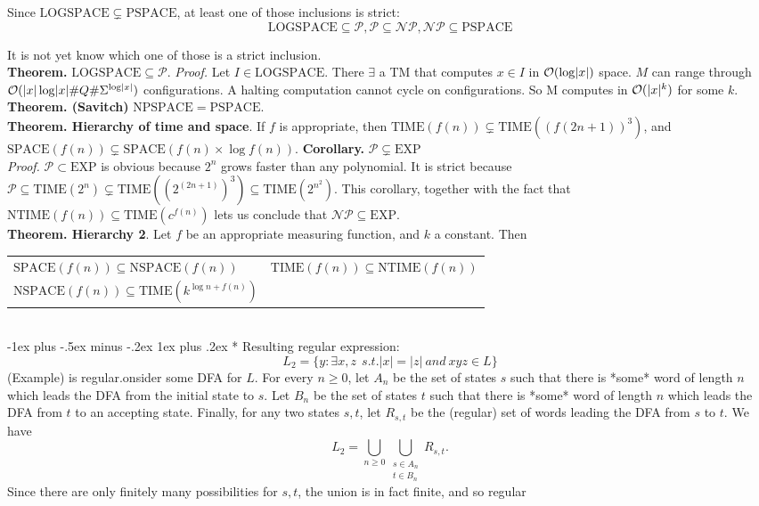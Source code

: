 \documentclass[10pt,landscape]{article}
\makeatletter
\renewcommand{\P}{\mathcal{P}}
\newcommand{\NP}{\mathcal{NP}}
\newcommand{\LOGSPACE}{\mathrm{LOGSPACE}}
\newcommand{\SPACE}{\mathrm{SPACE}}
\newcommand{\PSPACE}{\mathrm{PSPACE}}
\newcommand{\NSPACE}{\mathrm{NSPACE}}
\newcommand{\NPSPACE}{\mathrm{NPSPACE}}
\newcommand{\EXP}{\mathrm{EXP}}
\newcommand{\TIME}{\mathrm{TIME}}
\newcommand{\NTIME}{\mathrm{NTIME}}
\renewcommand{\O}{\mathcal{O}}
\DeclarePairedDelimiter\abs{\lvert}{\rvert}
\theoremstyle{plain}%
\theoremstyle{definition}
\theoremstyle{remark}
\renewcommand{\subsubsection}{\@startsection{subsubsection}{3}{0mm}%
                                {-1ex plus -.5ex minus -.2ex}%
                                {1ex plus .2ex}%
                                {\normalfont\small\bfseries}}
\makeatother
\begin{document}
\begin{multicols}{3}
Since $\LOGSPACE \subsetneq \PSPACE$, at least one of those inclusions is strict:
\[ \LOGSPACE \subseteq \P, \P \subseteq \NP, \NP \subseteq \PSPACE \]

It is not yet know which one of those is a strict inclusion. \\[.2cm]

\textbf{Theorem. } $\LOGSPACE \subseteq \P$. \textit{Proof.}
Let $I \in \LOGSPACE$. There $\exists$ a TM that computes $x \in I$
in $\O(\log \abs{x})$ space. $M$ can range through $\O(\abs{x} \log\abs{x} \#Q \#\Sigma^{\log\abs{x}})$
configurations. A halting computation cannot cycle on configurations. So M computes in $\O(\abs{x}^k)$ for some $k$.
\\[.2cm]

\textbf{Theorem. (Savitch)} $\NPSPACE = \PSPACE$.
\\[.2cm]

\textbf{Theorem. Hierarchy of time and space}.
If $f$ is appropriate, then $\TIME(f(n)) \subsetneq \TIME((f(2n+1))^3)$, and 
$\SPACE(f(n)) \subsetneq \SPACE(f(n) \times \log f(n))$.
\textbf{Corollary. } $\P \subsetneq \EXP$\\
\textit{Proof.}
$\P \subset \EXP$ is obvious because $2^n$ grows faster than any polynomial. It is 
strict because $\P \subseteq \TIME(2^n) \subsetneq \TIME((2^{(2n+1)})^3) \subseteq \TIME(2^{n^2}) $.
This corollary, together with the fact that $\NTIME(f(n)) \subseteq \TIME(c^{f(n)})$ lets us
conclude that $\NP \subseteq \EXP$.
\\[.2cm]

\textbf{Theorem. Hierarchy 2}. Let $f$ be an appropriate measuring function, and $k$ a constant. Then
    \begin{tabular}{@{}ll@{}}
        $\SPACE(f(n)) \subseteq \NSPACE(f(n))$  & $\TIME(f(n)) \subseteq \NTIME(f(n))$ \\ 
        $\NSPACE(f(n)) \subseteq \TIME(k^{\log n + f(n)})$ & \\ 
    \end{tabular}
\\
\subsubsection*{ Resulting regular expres­sion:} 
\[L_2 = \{y : \exists x,z\ \ s.t.|x|=|z|\ and\ xyz \in L \}\](Example) is regular.onsider some DFA for $L$. For every $n \geq 0$, let $A_n$ be the set of states $s$ such that there is *some* word of length $n$ which leads the DFA from the initial state to $s$. Let $B_n$ be the set of states $t$ such that there is *some* word of length $n$ which leads the DFA from $t$ to an accepting state. Finally, for any two states $s,t$, let $R_{s,t}$ be the (regular) set of words leading the DFA from $s$ to $t$. We have
$$ L_2 = \bigcup_{n \geq 0} \bigcup_{\substack{s \in A_n \\ t \in B_n}} R_{s,t}. $$
Since there are only finitely many possibilities for $s,t$, the union is in fact finite, and so regular

\end{multicols}
\end{document}
